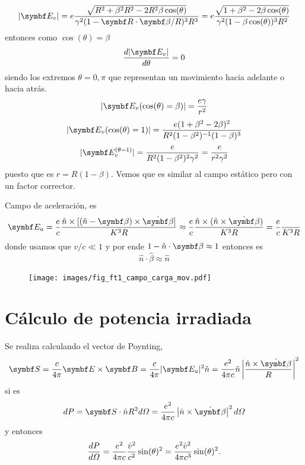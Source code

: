 \documentclass[10pt,oneside]{CBFT_book}
\begin{document}
\[
	|\vb{E}_v| = e\frac{\sqrt{ R^2 + \beta^2 R^2 - 2R^2 \beta \cos(\theta)}}
		{\gamma^2( 1 - \vb{R}\cdot\vb{\beta}/R)^3 R^3} =
		e\frac{\sqrt{ 1 + \beta^2 - 2 \beta \cos(\theta)}}
		{\gamma^2( 1 - \beta \cos(\theta))^3 R^2}
\]
entonces como $\cos(\theta) = \beta$
\[
	\dtot{ |\vb{E}_v| }{\theta}= 0
\]
siendo los extremos $\theta=0,\pi$ que representan un movimiento hacia adelante o hacia atrás.
\[
	|\vb{E}_v(\cos(\theta) = \beta)| = \frac{e\gamma}{r^2}
\]
\[
	|\vb{E}_v(\cos(\theta) = 1)| = \frac{e (1+\beta^2-2\beta)^2}{R^2(1-\beta^2)^{-1}(1-\beta)^3}
\]
\[
	|\vb{E}_v^{(\theta = 1)}| = \frac{e }{R^2(1-\beta^2)^2 \gamma^2} = \frac{e}{r^2 \gamma^2}
\]
puesto que es $r=R(1-\beta)$. Vemos que es similar al campo estático pero con un factor corrector.

Campo de aceleración, es
\[
	\vb{E}_a = \frac{e}{c} \frac{ \hat{n} \times [ (\hat{n}-\vb{\beta})\times \dot{\vb{\beta}} ]}{K^3 R} 
		\approx \frac{e}{c} \frac{ \hat{n} \times ( \hat{n} \times \dot{\vb{\beta}})}{K^3 R} 
		= \frac{e}{c} \frac{}{K^3 R}
\]
donde usamos que $v/c \ll 1$ y por ende $ 1 - \hat{n}\cdot\vb{\beta}\approx 1$ entonces es 
\[
	\hat{n} \cdot \hat{\beta} \approx \hat{n}
\]

\begin{figure}[htb]
	\begin{center}
	\texttt{[image: images/fig\_ft1\_campo\_carga\_mov.pdf]}	 
	\end{center}
	\caption{}
\end{figure}

\section{Cálculo de potencia irradiada}

Se realiza calculando el vector de Poynting,
\[
	\vb{S} = \frac{c}{4\pi} \pv{E}{B} = \frac{c}{4\pi} |\vb{E}_a|^2 \hat{n} =  \frac{e^2}{4\pi c}
		\hat{n} \left| \frac{\hat{n} \times \dot{\vb{\beta}} }{R} \right|^2
\]
si es 
\[
	dP = \vb{S}\cdot\hat{n} R^2 d\Omega =
		\frac{e^2}{4\pi c} \left| \hat{n} \times \dot{\vb{\beta}} \right|^2 d\Omega
\]
y entonces 
\[
	\frac{d^{\hspace{-0.05em}} {P}}{d {\Omega}^{\hspace{-0.05em}}} = \frac{e^2}{4\pi c} \frac{\dot{v}^2}{c^2} \sin(\theta)^2 = 
		\frac{e^2 \dot{v}^2 }{4\pi c^3} \sin(\theta)^2.
\]
\end{document}

